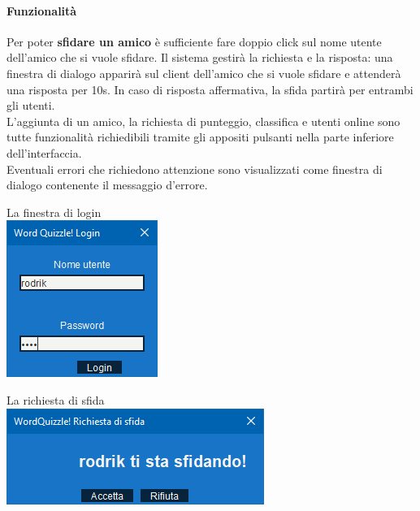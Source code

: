 \documentclass[10pt]{article}
\begin{document}
{\paragraph{Funzionalità} Per poter \textbf{sfidare un amico} è sufficiente fare doppio click sul nome utente dell'amico che si vuole sfidare. Il sistema gestirà la richiesta e la risposta: una finestra di dialogo apparirà sul client dell'amico che si vuole sfidare e attenderà una risposta per 10s. In caso di risposta affermativa, la sfida partirà per entrambi gli utenti.\\
L'aggiunta di un amico, la richiesta di punteggio, classifica e utenti online sono tutte funzionalità richiedibili tramite gli appositi pulsanti nella parte inferiore dell'interfaccia.\\
Eventuali errori che richiedono attenzione sono visualizzati come finestra di dialogo contenente il messaggio d'errore.
\begin{multicols}{2}
\begin{center}
La finestra di login\\
\includegraphics[scale=1]{login.png}
\end{center}
\begin{center}
La richiesta di sfida\\
\includegraphics[scale=1]{sfida.png}
\end{center}
\end{multicols}
\pagebreak

}
\end{document}
